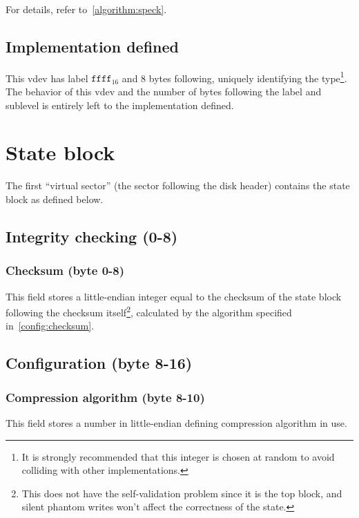 \documentclass[11pt,a4paper]{report}
\begin{document}
        For details, refer to~\ref{algorithm:speck}.


        \section{Implementation defined}
        This vdev has label $\texttt{ffff}_{16}$ and 8 bytes following, uniquely
        identifying the type\footnote{It is strongly recommended that this
        integer is chosen at random to avoid colliding with other
        implementations.}. The behavior of this vdev and the number of bytes
        following the label and sublevel is entirely left to the implementation
        defined.

    \chapter{State block}
    \label{stateblock}
    The first ``virtual sector'' (the sector following the disk header)
    contains the state block as defined below.

    \section{Integrity checking (0-8)}
        \subsection{Checksum (byte 0-8)}
        This field stores a little-endian integer equal to the checksum of the
        state block following the checksum itself\footnote{This does not have
        the self-validation problem since it is the top block, and silent
        phantom writes won't affect the correctness of the state.}, calculated
        by the algorithm specified in~\ref{config:checksum}.

    \section{Configuration (byte 8-16)}
        \subsection{Compression algorithm (byte 8-10)}
        \label{config:compression}
        This field stores a number in little-endian defining compression
        algorithm in use.
\end{document}
